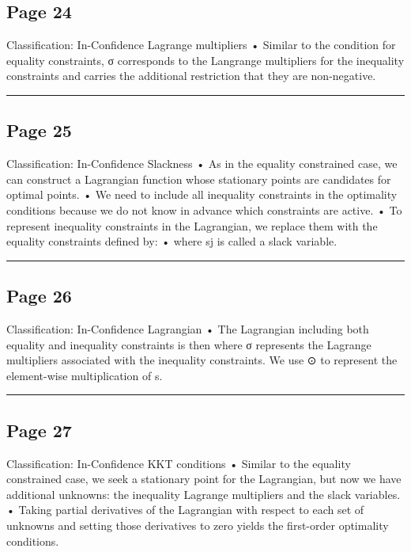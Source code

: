 \documentclass[
]{article}
\begin{document}
\subsection{Page 24}\label{page-24}

Classification: In-Confidence Lagrange multipliers • Similar to the
condition for equality constraints, σ corresponds to the Langrange
multipliers for the inequality constraints and carries the additional
restriction that they are non-negative.

\begin{center}\rule{0.5\linewidth}{0.5pt}\end{center}

\subsection{Page 25}\label{page-25}

Classification: In-Confidence Slackness • As in the equality constrained
case, we can construct a Lagrangian function whose stationary points are
candidates for optimal points. • We need to include all inequality
constraints in the optimality conditions because we do not know in
advance which constraints are active. • To represent inequality
constraints in the Lagrangian, we replace them with the equality
constraints defined by: • where sj is called a slack variable.

\begin{center}\rule{0.5\linewidth}{0.5pt}\end{center}

\subsection{Page 26}\label{page-26}

Classification: In-Confidence Lagrangian • The Lagrangian including both
equality and inequality constraints is then where σ represents the
Lagrange multipliers associated with the inequality constraints. We use
⊙ to represent the element-wise multiplication of s.

\begin{center}\rule{0.5\linewidth}{0.5pt}\end{center}

\subsection{Page 27}\label{page-27}

Classification: In-Confidence KKT conditions • Similar to the equality
constrained case, we seek a stationary point for the Lagrangian, but now
we have additional unknowns: the inequality Lagrange multipliers and the
slack variables. • Taking partial derivatives of the Lagrangian with
respect to each set of unknowns and setting those derivatives to zero
yields the first-order optimality conditions.
\end{document}
